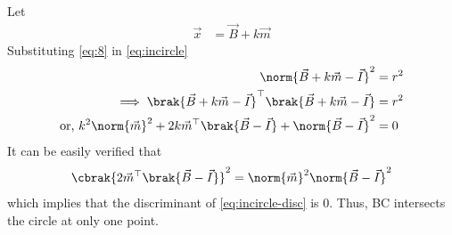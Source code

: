 \solution
Let 
\begin{align}
\vec{x} &= \vec{B} + k{\vec{m}}\label{eq:8}
\end{align}
Substituting \eqref{eq:8} in \eqref{eq:incircle}
\begin{align}
  \norm{ \vec{B} + k{\vec{m}}- \vec{I} }^2 &= r^2 \\
\implies   \brak{\vec{B} + k{\vec{m}}- \vec{I}}^{\top} \brak{\vec{B} + k{\vec{m}}- \vec{I}} &= r^2 
\\
	\text{or, }
	k^2\norm{\vec{m}}^2 +2k{\vec{m}^{\top}}\brak{{\vec{B}-\vec{I}}}+\norm{\vec{B}-\vec{I}}^2 &= 0
	\label{eq:incircle-disc}
\end{align}
It can be easily verified that 
\begin{align}
\cbrak{2\vec{m}^{\top}\brak{\vec{B}-\vec{I}}}^2
= 
	\norm{\vec{m}}^2\norm{\vec{B}-\vec{I}}^2
\end{align}
which implies that the discriminant of 
	\eqref{eq:incircle-disc}
	is 0.  Thus, BC intersects the circle at only one point.

